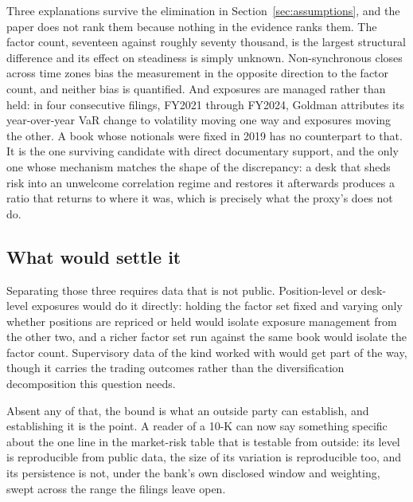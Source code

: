 Three explanations survive the elimination in Section~\ref{sec:assumptions},
and the paper does not rank them because nothing in the evidence ranks them.
The factor count, seventeen against roughly seventy thousand, is the
largest structural difference and its effect on steadiness is simply unknown.
Non-synchronous closes across time zones bias the measurement in the opposite
direction to the factor count, and neither bias is quantified. And exposures
are managed rather than held: in four consecutive filings, FY2021 through
FY2024, Goldman attributes its year-over-year VaR change to volatility moving
one way and exposures moving the other. A book whose notionals were fixed in
2019 has no counterpart to that. It is the one surviving candidate with direct
documentary support, and the only one whose mechanism matches the shape of the
discrepancy: a desk that sheds risk into an unwelcome correlation regime and
restores it afterwards produces a ratio that returns to where it was, which is
precisely what the proxy's does not do.

\subsection*{What would settle it}

Separating those three requires data that is not public. Position-level or
desk-level exposures would do it directly: holding the factor set fixed and
varying only whether positions are repriced or held would isolate exposure
management from the other two, and a richer factor set run against the same
book would isolate the factor count. Supervisory data of the kind
\citet{obrien2017evaluation} worked with would get part of the way, though it
carries the trading outcomes rather than the diversification decomposition this
question needs.

Absent any of that, the bound is what an outside party can establish, and
establishing it is the point. A reader of a 10-K can now say something specific
about the one line in the market-risk table that is testable from outside: its
level is reproducible from public data, the size of its variation is
reproducible too, and its persistence is not, under the bank's own disclosed
window and weighting, swept across the range the filings leave open.
